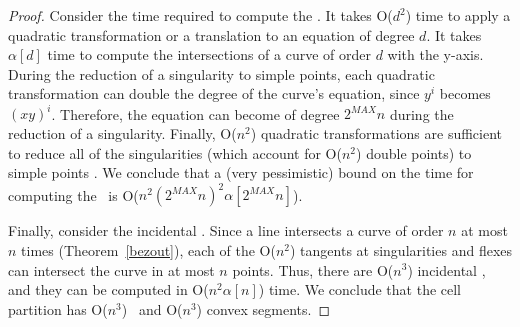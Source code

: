 \begin{proof}
Consider the time required to compute the \pseudos.
It takes O($d^{2}$) time to apply a quadratic transformation or a 
translation to an equation of degree $d$.
It takes $\alpha[d]$ time to compute the intersections of a curve
of order $d$ with the y-axis.
During the reduction of a singularity to simple points, each quadratic
transformation can double the degree of the curve's equation, since
$y^{i}$ becomes $(xy)^{i}$.
Therefore, the equation can become of degree $2^{MAX}n$ during the
reduction of a singularity.
Finally, O($n^{2}$) quadratic transformations are sufficient to reduce
all of 
the singularities (which account for O($n^{2}$) double points) to simple
points \cite{abba3}.
We conclude that a (very pessimistic) bound on the time for computing 
the \pseudos\ is O($n^{2}(2^{MAX}n)^{2}\alpha[2^{MAX}n]$).

Finally, consider the incidental \wallpoints.
Since a line intersects a curve of order $n$ at most $n$ 
times (Theorem~\ref{bezout}), 
each of the O($n^{2}$) tangents at singularities and flexes 
can intersect the curve in 
at most $n$ points.
Thus, there are O($n^{3}$) incidental \wallpoints, and they 
can be computed in O($n^{2}\alpha[n]$) time.
We conclude that the cell partition has O($n^{3}$) \wallpoints\ and
O($n^{3}$) convex segments.


\end{proof}

